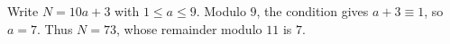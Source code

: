 Write $N=10a+3$ with $1\le a\le9$. Modulo $9$, the condition gives $a+3\equiv1$, so $a=7$. Thus $N=73$, whose remainder modulo $11$ is $\boxed7$.
